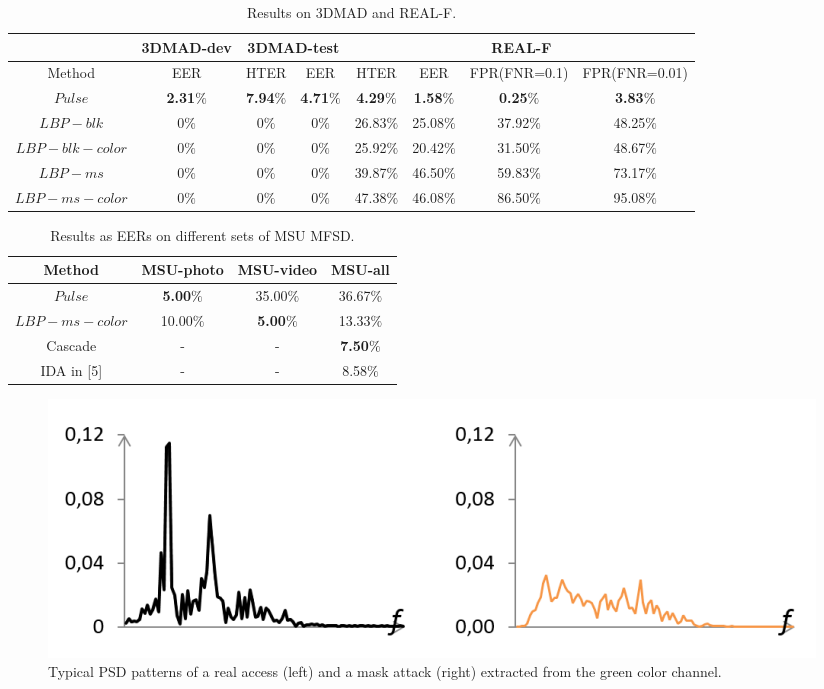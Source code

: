 \documentclass[journal]{IEEEtran}
\begin{document}
\begin{table}[ht]
	\renewcommand{\arraystretch}{1.3}
	\normalsize
	\centering
	\caption{Results on 3DMAD and REAL-F.}
	\label{tab_F_1}
	\begin{tabular}{|c|c|c|c|c|c|c|c|}
		\hline
		&3DMAD-dev & \multicolumn{2}{c|}{3DMAD-test} & \multicolumn{4}{c|}{REAL-F} \\
		\hline \hline
		Method & EER & HTER & EER & HTER & EER & FPR(FNR=0.1) & FPR(FNR=0.01) \\
		\hline
		$Pulse$ & \textbf{2.31$\%$} & \textbf{7.94$\%$} & \textbf{4.71$\%$} & \textbf{4.29$\%$} & \textbf{1.58$\%$} & \textbf{0.25$\%$} & \textbf{3.83$\%$} \\
		\hline
		$LBP-blk$ & 0$\%$ & 0$\%$ & 0$\%$ & 26.83$\%$ & 25.08$\%$ & 37.92$\%$ & 48.25$\%$ \\
		\hline
		$LBP-blk-color$ & 0$\%$ & 0$\%$ & 0$\%$ & 25.92$\%$ & 20.42$\%$ & 31.50$\%$ & 48.67$\%$ \\
		\hline
		$LBP-ms$ & 0$\%$ & 0$\%$ & 0$\%$ & 39.87$\%$ & 46.50$\%$ & 59.83$\%$ & 73.17$\%$ \\
		\hline
		$LBP-ms-color$ & 0$\%$ & 0$\%$ & 0$\%$ & 47.38$\%$ & 46.08$\%$ & 86.50$\%$ & 95.08$\%$ \\
		\hline
	\end{tabular}
\end{table}

\begin{table}[ht]
	\renewcommand{\arraystretch}{1.3}
	\normalsize
	\centering
	\caption{Results as EERs on different sets of MSU MFSD.}
	\label{tab_F_2}
	\begin{tabular}{|c|c|c|c|}
		\hline
		Method & MSU-photo & MSU-video & MSU-all \\
		\hline \hline
		$Pulse$ & \textbf{5.00$\%$} & 35.00$\%$ & 36.67$\%$ \\
		\hline
		$LBP-ms-color$ & 10.00$\%$ & \textbf{5.00$\%$} & 13.33$\%$ \\
		\hline \hline
		Cascade & - & - & \textbf{7.50$\%$} \\
		\hline
		IDA in [5] & - & - & 8.58$\%$ \\
		\hline
	\end{tabular}
\end{table}

\begin{figure}[!t]
	\centering
	\includegraphics[width=1\linewidth]{img/F_4}
	\caption{Typical PSD patterns of a real access (left) and a mask attack (right) extracted from the green color channel.}
	\label{fig_F_4}
\end{figure}
\end{document}
